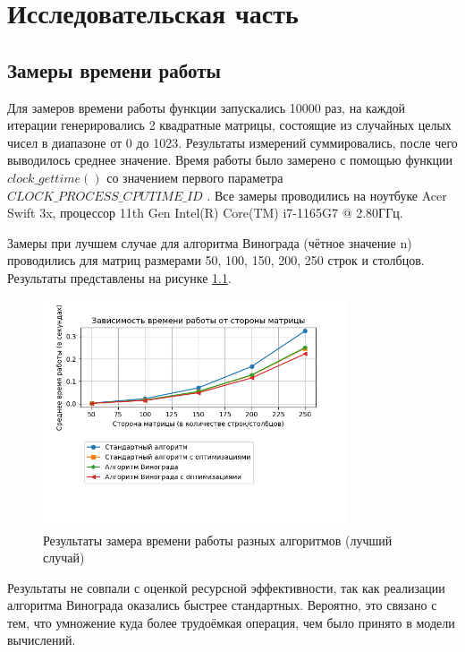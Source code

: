 \chapter{Исследовательская часть}

\section{Замеры времени работы}

Для замеров времени работы функции запускались 10000 раз, на каждой итерации генерировались 2 квадратные матрицы, состоящие из случайных целых чисел в диапазоне от 0 до 1023. Результаты измерений суммировались, после чего выводилось среднее значение. Время работы было замерено с помощью функции $clock\_gettime()$ со значением первого параметра $CLOCK\_PROCESS\_CPUTIME\_ID$ \cite{clockgettime}. Все замеры проводились на ноутбуке Acer Swift 3x, процессор 11th Gen Intel(R) Core(TM) i7-1165G7 @ 2.80ГГц. 

Замеры при лучшем случае для алгоритма Винограда (чётное значение n) проводились для матриц размерами 50, 100, 150, 200, 250 строк и столбцов. Результаты представлены на рисунке \ref{fig:res1}.

\begin{figure}[h!]
	\centering
	\includegraphics[width=0.8\textwidth]{tex_parts/graphicBest.png}
	\caption{\label{fig:res1} Результаты замера времени работы разных алгоритмов (лучший случай)}
\end{figure}

Результаты не совпали с оценкой ресурсной эффективности, так как реализации алгоритма Винограда оказались быстрее стандартных. Вероятно, это связано с тем, что умножение куда более трудоёмкая операция, чем было принято в модели вычислений.

